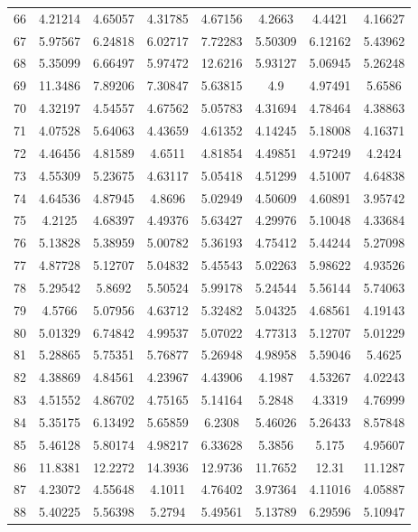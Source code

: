 \begin{center}
\begin{longtable}{cccccccc}
66 & 4.21214 & 4.65057 & 4.31785 & 4.67156 & 4.2663 & 4.4421 & 4.16627\\
67 & 5.97567 & 6.24818 & 6.02717 & 7.72283 & 5.50309 & 6.12162 & 5.43962\\
68 & 5.35099 & 6.66497 & 5.97472 & 12.6216 & 5.93127 & 5.06945 & 5.26248\\
69 & 11.3486 & 7.89206 & 7.30847 & 5.63815 & 4.9 & 4.97491 & 5.6586\\
70 & 4.32197 & 4.54557 & 4.67562 & 5.05783 & 4.31694 & 4.78464 & 4.38863\\
71 & 4.07528 & 5.64063 & 4.43659 & 4.61352 & 4.14245 & 5.18008 & 4.16371\\
72 & 4.46456 & 4.81589 & 4.6511 & 4.81854 & 4.49851 & 4.97249 & 4.2424\\
73 & 4.55309 & 5.23675 & 4.63117 & 5.05418 & 4.51299 & 4.51007 & 4.64838\\
74 & 4.64536 & 4.87945 & 4.8696 & 5.02949 & 4.50609 & 4.60891 & 3.95742\\
75 & 4.2125 & 4.68397 & 4.49376 & 5.63427 & 4.29976 & 5.10048 & 4.33684\\
76 & 5.13828 & 5.38959 & 5.00782 & 5.36193 & 4.75412 & 5.44244 & 5.27098\\
77 & 4.87728 & 5.12707 & 5.04832 & 5.45543 & 5.02263 & 5.98622 & 4.93526\\
78 & 5.29542 & 5.8692 & 5.50524 & 5.99178 & 5.24544 & 5.56144 & 5.74063\\
79 & 4.5766 & 5.07956 & 4.63712 & 5.32482 & 5.04325 & 4.68561 & 4.19143\\
80 & 5.01329 & 6.74842 & 4.99537 & 5.07022 & 4.77313 & 5.12707 & 5.01229\\
81 & 5.28865 & 5.75351 & 5.76877 & 5.26948 & 4.98958 & 5.59046 & 5.4625\\
82 & 4.38869 & 4.84561 & 4.23967 & 4.43906 & 4.1987 & 4.53267 & 4.02243\\
83 & 4.51552 & 4.86702 & 4.75165 & 5.14164 & 5.2848 & 4.3319 & 4.76999\\
84 & 5.35175 & 6.13492 & 5.65859 & 6.2308 & 5.46026 & 5.26433 & 8.57848\\
85 & 5.46128 & 5.80174 & 4.98217 & 6.33628 & 5.3856 & 5.175 & 4.95607\\
86 & 11.8381 & 12.2272 & 14.3936 & 12.9736 & 11.7652 & 12.31 & 11.1287\\
87 & 4.23072 & 4.55648 & 4.1011 & 4.76402 & 3.97364 & 4.11016 & 4.05887\\
88 & 5.40225 & 5.56398 & 5.2794 & 5.49561 & 5.13789 & 6.29596 & 5.10947\\

\end{longtable}
\end{center}
